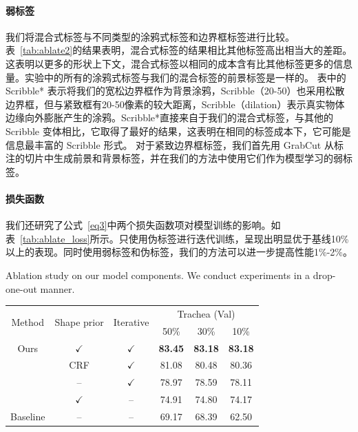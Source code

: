 \paragraph{弱标签}
我们将混合式标签与不同类型的涂鸦式标签和边界框标签进行比较。表~\ref{tab:ablate2}的结果表明，混合式标签的结果相比其他标签高出相当大的差距。这表明以更多的形状上下文，混合式标签以相同的成本含有比其他标签更多的信息量。实验中的所有的涂鸦式标签与我们的混合标签的前景标签是一样的。
表中的 Scribble* 表示将我们的宽松边界框作为背景涂鸦，Scribble（20-50）也采用松散边界框，但与紧致框有20-50像素的较大距离，Scribble（dilation）表示真实物体边缘向外膨胀产生的涂鸦。Scribble*直接来自于我们的混合式标签，与其他的 Scribble 变体相比，它取得了最好的结果，这表明在相同的标签成本下，它可能是信息最丰富的 Scribble 形式。
对于紧致边界框标签，我们首先用 GrabCut 从标注的切片中生成前景和背景标签，并在我们的方法中使用它们作为模型学习的弱标签。
\paragraph{损失函数}
我们还研究了公式~\ref{eq3}中两个损失函数项对模型训练的影响。如表~\ref{tab:ablate_loss}所示。只使用伪标签进行迭代训练，呈现出明显优于基线10\%以上的表现。同时使用弱标签和伪标签，我们的方法可以进一步提高性能1\%-2\%。

\begin{table}[t!]
    \centering    
    {Ablation study on our model components. We conduct experiments in a drop-one-out manner.}
    \begin{tabular}[t]{c c c|c c c}
        \toprule
        \multirow{2}{*}{Method} & \multirow{2}{*}{Shape prior} & \multirow{2}{*}{Iterative}  & \multicolumn{3}{c}{Trachea (Val)} \\ %
        &                       &              & 50\% & 30\% & 10\%                 \\ \midrule
        Ours      & $\checkmark$  & $\checkmark$      & \textbf{83.45} & \textbf{83.18} & \textbf{83.18} \\ %
        & CRF      & $\checkmark$      & 81.08 & 80.48 & 80.36 \\
        & --            & $\checkmark$      & 78.97 & 78.59 & 78.11 \\ %
        & $\checkmark$  & --                & 74.91 & 74.80 & 74.17 \\
        Baseline      & --            & --                          & 69.17 & 68.39 & 62.50 \\
        \bottomrule 
    \end{tabular}
    \label{tab:ablate1}
\end{table}

